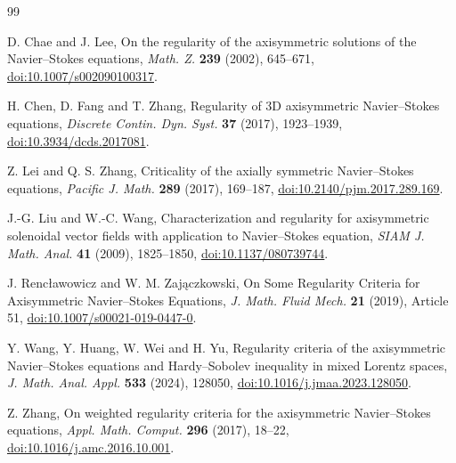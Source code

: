 \documentclass[11pt]{article}
\numberwithin{equation}{section}
\theoremstyle{remark}
\begin{document}
\begin{thebibliography}{99}

D. Chae and J. Lee,
On the regularity of the axisymmetric solutions of the Navier--Stokes equations,
\emph{Math. Z.} \textbf{239} (2002), 645--671,
\href{https://doi.org/10.1007/s002090100317}{doi:10.1007/s002090100317}.

H. Chen, D. Fang and T. Zhang,
Regularity of 3D axisymmetric Navier--Stokes equations,
\emph{Discrete Contin. Dyn. Syst.} \textbf{37} (2017), 1923--1939,
\href{https://doi.org/10.3934/dcds.2017081}{doi:10.3934/dcds.2017081}.

Z. Lei and Q. S. Zhang,
Criticality of the axially symmetric Navier--Stokes equations,
\emph{Pacific J. Math.} \textbf{289} (2017), 169--187,
\href{https://doi.org/10.2140/pjm.2017.289.169}{doi:10.2140/pjm.2017.289.169}.

J.-G. Liu and W.-C. Wang,
Characterization and regularity for axisymmetric solenoidal vector fields with application to Navier--Stokes equation,
\emph{SIAM J. Math. Anal.} \textbf{41} (2009), 1825--1850,
\href{https://doi.org/10.1137/080739744}{doi:10.1137/080739744}.

J. Renc\l awowicz and W. M. Zaj\k aczkowski,
On Some Regularity Criteria for Axisymmetric Navier--Stokes Equations,
\emph{J. Math. Fluid Mech.} \textbf{21} (2019), Article 51,
\href{https://doi.org/10.1007/s00021-019-0447-0}{doi:10.1007/s00021-019-0447-0}.

Y. Wang, Y. Huang, W. Wei and H. Yu,
Regularity criteria of the axisymmetric Navier--Stokes equations and Hardy--Sobolev inequality in mixed Lorentz spaces,
\emph{J. Math. Anal. Appl.} \textbf{533} (2024), 128050,
\href{https://doi.org/10.1016/j.jmaa.2023.128050}{doi:10.1016/j.jmaa.2023.128050}.

Z. Zhang,
On weighted regularity criteria for the axisymmetric Navier--Stokes equations,
\emph{Appl. Math. Comput.} \textbf{296} (2017), 18--22,
\href{https://doi.org/10.1016/j.amc.2016.10.001}{doi:10.1016/j.amc.2016.10.001}.

\end{thebibliography}
\end{document}
